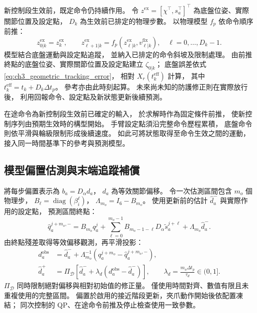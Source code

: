 新控制段生效前，既定命令仍持續作用。
令 $z^{\mathrm{ex}}=[\chi^\top,s_a^\top]^\top$
為底盤位姿、實際關節位置及設定點，
$D_k$ 為生效前已排定的物理步數。
以物理模型 $f_p$ 依命令順序前推：
\begin{equation}
    z_{0|k}^{\mathrm{ex}}=z_k^{\mathrm{ex}},\qquad
    z_{\ell+1|k}^{\mathrm{ex}}=
    f_p(z_{\ell|k}^{\mathrm{ex}},v_{\ell|k}^{\mathrm{fix}}),
    \quad \ell=0,\ldots,D_k-1 .
    \label{eq:ch3_queued_command_forward_prediction}
\end{equation}
模型結合底盤運動與設定點追蹤，
並納入已排定的命令斜坡及限制處理。
由前推終點的底盤位姿、實際關節位置及設定點建立 $\zeta_{0|k}$；
底盤誤差依式\eqref{eq:ch3_geometric_tracking_error}，
相對 $X_r(t_k^{\mathrm{eff}})$ 計算，
其中 $t_k^{\mathrm{eff}}=t_k+D_k\Delta t_p$。
參考亦由此時刻起算。
未來尚未知的防護修正則在實際放行後，
利用回報命令、設定點及新狀態更新後續預測。

在途命令為新控制段生效前已確定的輸入，
於求解時作為固定條件前推，
使新控制序列由預期生效時的構型開始。
手臂設定點須沿完整命令歷程累積，
底盤命令則依平滑與輪級限制形成後續速度。
如此可將狀態取得至命令生效之間的運動，
接入同一時間基準下的參考與預測模型。

\subsection{模型偏置估測與末端追蹤補償}
\label{subsec:model_bias_tcp_compensation}

將每步偏置表示為 $b_a=D_\alpha d_a$，
$d_a$ 為等效關節偏移。
令一次估測區間包含 $m_o$ 個物理步，
$B_\ell=\operatorname{diag}(\beta_i^\ell)$，
$\Lambda_{m_o}=I_6-B_{m_o}$。
使用更新前的估計 $\hat d_a^-$ 與實際作用的設定點，
預測區間終點：
\begin{equation}
    \hat q_a^{j+m_o,-}=
    B_{m_o}q_a^j+
    \sum_{\ell=0}^{m_o-1}
    B_{m_o-1-\ell}D_\alpha\tilde s_a^{j+\ell}
    +\Lambda_{m_o}\hat d_a^- .
    \label{eq:ch3_interval_offset_prediction}
\end{equation}
由終點殘差取得等效偏移觀測，再平滑投影：
\begin{equation}
    \begin{aligned}
        d_a^{\mathrm{obs}}&=\hat d_a^-+
        \Lambda_{m_o}^{-1}(q_a^{j+m_o}-\hat q_a^{j+m_o,-}),\\
        \hat d_a^+&=\Pi_{\mathcal D}
        [\hat d_a^-+\lambda_d(d_a^{\mathrm{obs}}-\hat d_a^-)],
        \qquad \lambda_d=\frac{m_o\Delta t_p}{\tau_d}\in(0,1].
    \end{aligned}
    \label{eq:ch3_interval_offset_update}
\end{equation}
$\Pi_{\mathcal D}$ 同時限制絕對偏移與相對初始值的修正量。
僅使用時間對齊、數值有限且未重複使用的完整區間。
偏置於啟用的接近階段更新，夾爪動作開始後依配置凍結；
同次控制的 QP、在途命令前推及停止檢查使用一致參數。

